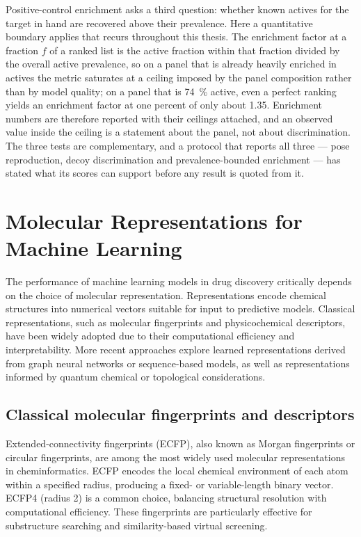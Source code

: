 Positive-control enrichment asks a third question: whether known actives for the target in hand are recovered above their prevalence. Here a quantitative boundary applies that recurs throughout this thesis. The enrichment factor at a fraction $f$ of a ranked list is the active fraction within that fraction divided by the overall active prevalence, so on a panel that is already heavily enriched in actives the metric saturates at a ceiling imposed by the panel composition rather than by model quality; on a panel that is \qty{74}{\percent} active, even a perfect ranking yields an enrichment factor at one percent of only about \num{1.35}. Enrichment numbers are therefore reported with their ceilings attached, and an observed value inside the ceiling is a statement about the panel, not about discrimination. The three tests are complementary, and a protocol that reports all three --- pose reproduction, decoy discrimination and prevalence-bounded enrichment --- has stated what its scores can support before any result is quoted from it.

\section{Molecular Representations for Machine Learning}

The performance of machine learning models in drug discovery critically depends on the choice of molecular representation. Representations encode chemical structures into numerical vectors suitable for input to predictive models. Classical representations, such as molecular fingerprints and physicochemical descriptors, have been widely adopted due to their computational efficiency and interpretability. More recent approaches explore learned representations derived from graph neural networks or sequence-based models, as well as representations informed by quantum chemical or topological considerations.

\subsection{Classical molecular fingerprints and descriptors}

Extended-connectivity fingerprints (ECFP), also known as Morgan fingerprints or circular fingerprints, are among the most widely used molecular representations in cheminformatics. ECFP encodes the local chemical environment of each atom within a specified radius, producing a fixed- or variable-length binary vector. ECFP4 (radius 2) is a common choice, balancing structural resolution with computational efficiency. These fingerprints are particularly effective for substructure searching and similarity-based virtual screening.

